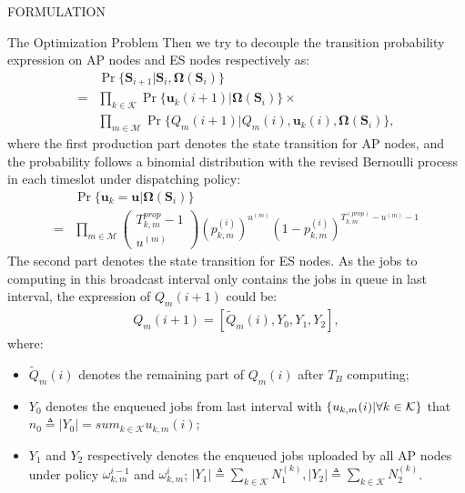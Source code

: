 \documentclass[10pt, conference, letterpaper]{IEEEtran}
\newcommand{\define}{\triangleq}
\renewcommand{\vec}{\mathbf}
\DeclarePairedDelimiter{\set}{\{}{\}}
\newcommand{\apSet}{\mathcal{K}}
\newcommand{\esSet}{\mathcal{M}}
\newcommand{\Stat}{\mathbf{S}}
\newcommand{\Policy}{\mathbf{\Omega}}
\begin{document}
\begin{section}{FORMULATION}
\begin{subsection}{The Optimization Problem}
            Then we try to decouple the transition probability expression on AP nodes and ES nodes respectively as:
            \begin{align}
                & \Pr\{\Stat_{i+1}|\Stat_{i}, \Policy(\Stat_{i})\} 
                \nonumber\\
                =& \prod_{k\in\apSet} \Pr\{\vec{u}_k(i+1)|\Policy(\Stat_{i})\} \times
                \nonumber\\
                & \prod_{m\in\esSet} \Pr\{Q_m(i+1)|Q_m(i), \vec{u}_k(i), \Policy(\Stat_{i})\},
            \end{align}
            where the first production part denotes the state transition for AP nodes, and the probability follows a binomial distribution with the revised Bernoulli process in each timeslot under dispatching policy:
            \begin{align}
                &\Pr\{\vec{u}_k=\vec{u}|\Policy(\Stat_i)\}
                \nonumber\\
                =& \prod_{m\in\esSet}
                    \begin{pmatrix}
                        T^{prop}_{k,m}-1 \\ u^{(m)}
                    \end{pmatrix}
                    (p^{(i)}_{k,m})^{u^{(m)}}
                    (1-p^{(i)}_{k,m})^{T^{(prop)}_{k,m}-u^{(m)}-1}
            \end{align}
            The second part denotes the state transition for ES nodes. As the jobs to computing in this broadcast interval only contains the jobs in queue in last interval, the expression of $Q_m(i+1)$ could be:
            \begin{align}
                Q_m(i+1) = [\tilde{Q}_m(i), Y_0, Y_1, Y_2],
            \end{align}
            where:
            \begin{itemize}
                \item $\tilde{Q}_m(i)$ denotes the remaining part of $Q_m(i)$ after $T_B$ computing;
                \item $Y_0$ denotes the enqueued jobs from last interval with $\set{u_{k,m}(i)|\forall k\in\apSet}$ that $n_0 \define |Y_0|=sum_{k\in\apSet} u_{k,m}(i)$;
                \item $Y_1$ and $Y_2$ respectively denotes the enqueued jobs uploaded by all AP nodes under policy $\omega_{k,m}^{i-1}$ and $\omega_{k,m}^{i}$; $|Y_1|\define\sum_{k\in\apSet}N^{(k)}_1, |Y_2|\define\sum_{k\in\apSet}N^{(k)}_2$.

\end{itemize}
\end{subsection}
\end{section}
\end{document}
